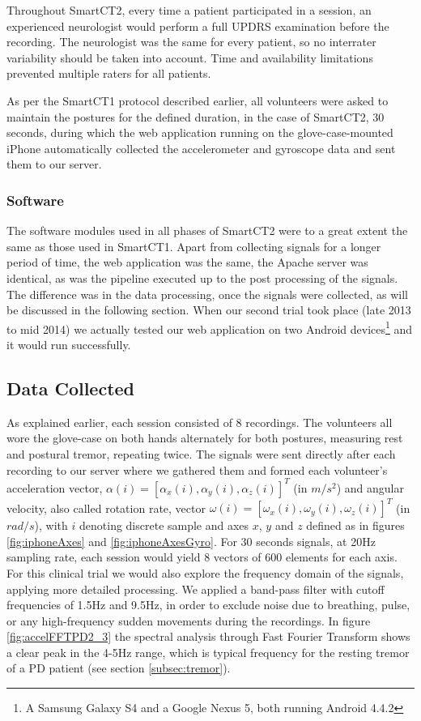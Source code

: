 Throughout \gls{SmartCT2}, every time a patient participated in a session, an experienced neurologist would perform a full \gls{UPDRS} examination before the recording. The neurologist was the same for every patient, so no interrater variability should be taken into account. Time and availability limitations prevented multiple raters for all patients. 

As per the \gls{SmartCT1} protocol described earlier, all volunteers were asked to maintain the postures for the defined duration, in the case of \gls{SmartCT2}, 30 seconds, during which the web application running on the glove-case-mounted iPhone automatically collected the accelerometer and gyroscope data and sent them to our server.
 
\subsubsection{Software}
\label{subsubsec:smartCT2Software}
The software modules used in all phases of \gls{SmartCT2} were to a great extent the same as those used in \gls{SmartCT1}. Apart from collecting signals for a longer period of time, the web application was the same, the Apache server was identical, as was the pipeline executed up to the post processing of the signals. The difference was in the data processing, once the signals were collected, as will be discussed in the following section. When our second trial took place (late 2013 to mid 2014) we actually tested our web application on two Android devices\footnote{A Samsung Galaxy S4 and a Google Nexus 5, both running Android 4.4.2} and it would run successfully. 

\subsection{Data Collected}
\label{subsec:SmartCT2Data}

As explained earlier, each session consisted of 8 recordings. The volunteers all wore the glove-case on both hands alternately for both postures, measuring rest and postural tremor, repeating twice. The signals were sent directly after each recording to our server where we gathered them and formed each volunteer's acceleration vector, $\alpha(i) = [\alpha_{x}(i),\alpha_{y}(i),\alpha_{z}(i)]^{T}$ (in $m/s^{2}$) and angular velocity, also called rotation rate, vector $\omega(i) = [\omega_{x}(i),\omega_{y}(i),\omega_{z}(i)]^{T}$ (in $rad/s$), with $i$ denoting discrete sample and axes $x$, $y$ and $z$ defined as in figures \ref{fig:iphoneAxes} and \ref{fig:iphoneAxesGyro}. For 30 seconds signals, at 20Hz sampling rate, each session would yield 8 vectors of 600 elements for each axis. For this clinical trial we would also explore the frequency domain of the signals, applying more detailed processing. We applied a band-pass filter with cutoff frequencies of 1.5Hz and 9.5Hz, in order to exclude noise due to breathing, pulse, or any high-frequency sudden movements during the recordings. In figure \ref{fig:accelFFTPD2_3} the spectral analysis through Fast Fourier Transform shows a clear peak in the 4-5Hz range, which is typical frequency for the resting tremor of a \gls{PD} patient (see section \ref{subsec:tremor}). 

